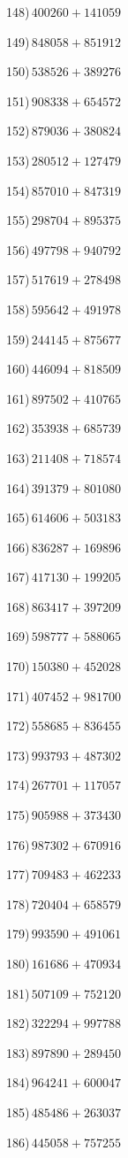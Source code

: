 \documentclass{article}
\begin{document}
\begin{multicols}{2}
148)$\,400260+141059$ \par 
149)$\,848058+851912$ \par 
150)$\,538526+389276$ \par 
151)$\,908338+654572$ \par 
152)$\,879036+380824$ \par 
153)$\,280512+127479$ \par 
154)$\,857010+847319$ \par 
155)$\,298704+895375$ \par 
156)$\,497798+940792$ \par 
157)$\,517619+278498$ \par 
158)$\,595642+491978$ \par 
159)$\,244145+875677$ \par 
160)$\,446094+818509$ \par 
161)$\,897502+410765$ \par 
162)$\,353938+685739$ \par 
163)$\,211408+718574$ \par 
164)$\,391379+801080$ \par 
165)$\,614606+503183$ \par 
166)$\,836287+169896$ \par 
167)$\,417130+199205$ \par 
168)$\,863417+397209$ \par 
169)$\,598777+588065$ \par 
170)$\,150380+452028$ \par 
171)$\,407452+981700$ \par 
172)$\,558685+836455$ \par 
173)$\,993793+487302$ \par 
174)$\,267701+117057$ \par 
175)$\,905988+373430$ \par 
176)$\,987302+670916$ \par 
177)$\,709483+462233$ \par 
178)$\,720404+658579$ \par 
179)$\,993590+491061$ \par 
180)$\,161686+470934$ \par 
181)$\,507109+752120$ \par 
182)$\,322294+997788$ \par 
183)$\,897890+289450$ \par 
184)$\,964241+600047$ \par 
185)$\,485486+263037$ \par 
186)$\,445058+757255$ \par 

\end{multicols}
\end{document}
